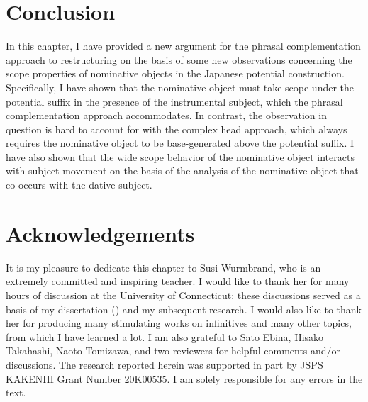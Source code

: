 \documentclass[output=paper]{langscibook}
\begin{document}
\section{Conclusion}\label{takahas6}
In this chapter, I have provided a new argument for the phrasal complementation approach to restructuring on the basis of some new observations concerning the scope properties of nominative objects in the Japanese potential construction. Specifically, I have shown that the nominative object must take scope under the potential suffix in the presence of the instrumental subject, which the phrasal complementation approach accommodates. In contrast, the observation in question is hard to account for with the complex head approach, which always requires the nominative object to be base-generated above the potential suffix. I have also shown that the wide scope behavior of the nominative object interacts with subject movement on the basis of the analysis of the nominative object that co-occurs with the dative subject.

\section*{Acknowledgements}
It is my pleasure to dedicate this chapter to Susi Wurmbrand, who is an extremely committed and inspiring teacher. I would like to thank her for many hours of discussion at the University of Connecticut; these discussions served as a basis of my dissertation (\citealt{takahashi2011}) and my subsequent research. I would also like to thank her for producing many stimulating works on infinitives and many other topics, from which I have learned a lot. I am also grateful to Sato Ebina, Hisako Takahashi, Naoto Tomizawa, and two reviewers for helpful comments and/or discussions. The research reported herein was supported in part by JSPS KAKENHI Grant Number 20K00535. I am solely responsible for any errors in the text.

{\sloppy\printbibliography[heading=subbibliography,notkeyword=this]}
\end{document}
